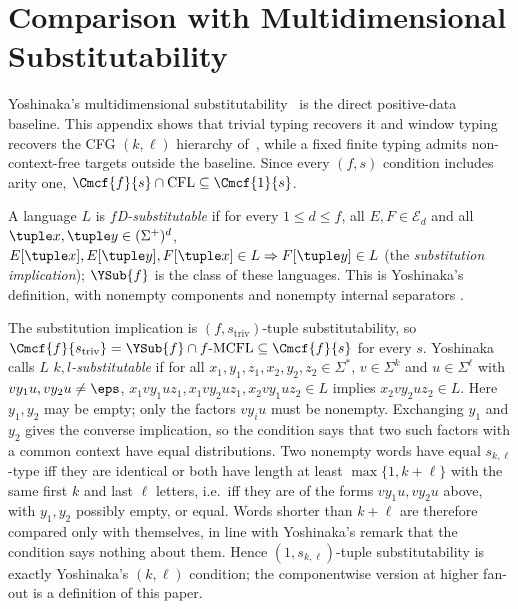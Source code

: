 \section{Comparison with Multidimensional Substitutability}
\label{sec:comparison}

Yoshinaka's multidimensional substitutability~\cite{Yoshinaka2009,Yoshinaka2011}
is the direct positive-data baseline.  This appendix shows that trivial typing
recovers it and window typing recovers the CFG $(k,\ell)$ hierarchy
of~\cite{Yoshinaka2008}, while a fixed finite typing admits non-context-free
targets outside the baseline.
Since every $(f,s)$ condition includes arity one,
$\Cmcf{f}{s}\cap\mathrm{CFL}\subseteq\Cmcf{1}{s}$.


\begin{definition}
\label{def:yoshinaka-pd-substitutability}
A language $L$ is \emph{$f$D-substitutable} if for every $1\le d\le f$, all
$E,F\in\mathcal E_d$ and all $\tuple x,\tuple y\in(\Sigma^+)^d$,
\(E[\tuple x],E[\tuple y],F[\tuple x]\in L\Rightarrow F[\tuple y]\in L\)
(the \emph{substitution implication}); $\YSub{f}$ is the class of these languages.
This is Yoshinaka's definition, with nonempty components and nonempty internal
separators \cite[Section~3.1 and footnote~3]{Yoshinaka2011}.
\end{definition}

The substitution implication is $(f,s_{\mathrm{triv}})$-tuple substitutability,
so $\Cmcf{f}{s_{\mathrm{triv}}}=\YSub{f}\cap f\text{-}\mathrm{MCFL}\subseteq\Cmcf{f}{s}$
for every $s$.  Yoshinaka \cite[Definition~2]{Yoshinaka2008} calls $L$
\emph{$k,l$-substitutable} if for all $x_1,y_1,z_1,x_2,y_2,z_2\in\Sigma^*$,
$v\in\Sigma^k$ and $u\in\Sigma^\ell$ with $vy_1u,vy_2u\ne\eps$,
$x_1vy_1uz_1,x_1vy_2uz_1,x_2vy_1uz_2\in L$ implies $x_2vy_2uz_2\in L$.  Here
$y_1,y_2$ may be empty; only the factors $vy_iu$ must be nonempty.  Exchanging
$y_1$ and $y_2$ gives the converse implication, so the condition says that two
such factors with a common context have equal distributions.  Two nonempty words
have equal $s_{k,\ell}$-type iff they are identical or both have length at least
$\max\{1,k+\ell\}$ with the same first $k$ and last $\ell$ letters, i.e.\ iff they
are of the forms $vy_1u,vy_2u$ above, with $y_1,y_2$ possibly empty, or equal.
Words shorter than $k+\ell$ are therefore compared only with themselves, in line
with Yoshinaka's remark that the condition says nothing about them.  Hence
$(1,s_{k,\ell})$-tuple substitutability is exactly Yoshinaka's $(k,\ell)$
condition; the componentwise version at higher fan-out is a definition of this
paper.

